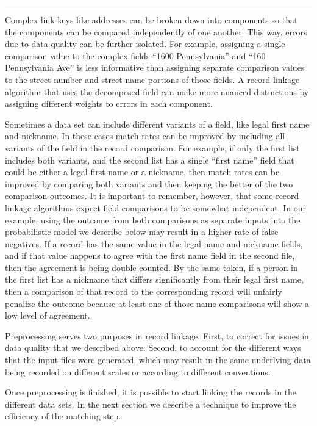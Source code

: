 \documentclass[]{krantz}
\begin{document}
\begin{center}\rule{0.5\linewidth}{\linethickness}\end{center}

Complex link keys like addresses can be broken down into components so
that the components can be compared independently of one another. This
way, errors due to data quality can be further isolated. For example,
assigning a single comparison value to the complex fields ``1600
Pennsylvania'' and ``160 Pennsylvania Ave'' is less informative than
assigning separate comparison values to the street number and street
name portions of those fields. A record linkage algorithm that uses the
decomposed field can make more nuanced distinctions by assigning
different weights to errors in each component.

Sometimes a data set can include different variants of a field, like
legal first name and nickname. In these cases match rates can be
improved by including all variants of the field in the record
comparison. For example, if only the first list includes both variants,
and the second list has a single ``first name'' field that could be
either a legal first name or a nickname, then match rates can be
improved by comparing both variants and then keeping the better of the
two comparison outcomes. It is important to remember, however, that some
record linkage algorithms expect field comparisons to be somewhat
independent. In our example, using the outcome from both comparisons as
separate inputs into the probabilistic model we describe below may
result in a higher rate of false negatives. If a record has the same
value in the legal name and nickname fields, and if that value happens
to agree with the first name field in the second file, then the
agreement is being double-counted. By the same token, if a person in the
first list has a nickname that differs significantly from their legal
first name, then a comparison of that record to the corresponding record
will unfairly penalize the outcome because at least one of those name
comparisons will show a low level of agreement.

Preprocessing serves two purposes in record linkage. First, to correct
for issues in data quality that we described above. Second, to account
for the different ways that the input files were generated, which may
result in the same underlying data being recorded on different scales or
according to different conventions.

Once preprocessing is finished, it is possible to start linking the
records in the different data sets. In the next section we describe a
technique to improve the efficiency of the matching step.
\end{document}
